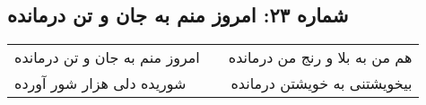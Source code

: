 \begin{center}
\section*{شماره ۲۳: امروز منم به جان و تن درمانده}
\label{sec:023}
\begin{longtable}{l p{0.5cm} r}
امروز منم به جان و تن درمانده
&&
هم من به بلا و رنج من درمانده
\\
شوریده دلی هزار شور آورده
&&
بیخویشتنی به خویشتن درمانده
\\
\end{longtable}
\end{center}
